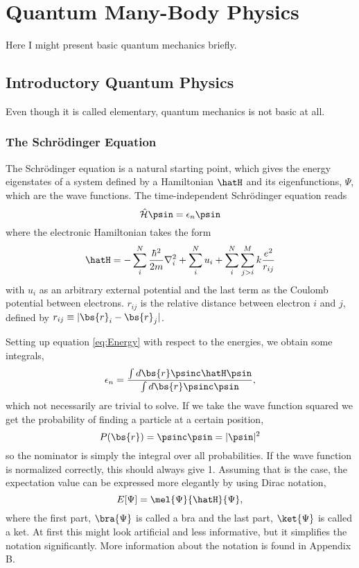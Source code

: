\chapter{Quantum Many-Body Physics} \label{sec:quantum}
Here I might present basic quantum mechanics briefly.

\section{Introductory Quantum Physics} \label{subsec:elementary}
Even though it is called elementary, quantum mechanics is not basic at all. 

\subsection{The Schrödinger Equation} \label{subsubsec:schrodinger}
The Schrödinger equation is a natural starting point, which gives the energy eigenstates of a system defined by a Hamiltonian $\hatH$ and its eigenfunctions, $\Psi$, which are the wave functions. The time-independent Schrödinger equation reads
\begin{equation}
\label{eq:Energy}
 \hat{\mathcal{H}}\psin=\epsilon_n\psin
\end{equation}
where the electronic Hamiltonian takes the form
\begin{equation}
\hatH=-\sum_i^N\frac{\hbar^2}{2m}\nabla_i^2+\sum_i^Nu_i + \sum_i^N\sum_{j>i}^Mk\frac{e^2}{r_{ij}}
\label{eq:ElectronicHamiltonian}
\end{equation}
with $u_i$ as an arbitrary external potential and the last term as the Coulomb potential between electrons. $r_{ij}$ is the relative distance between electron $i$ and $j$, defined by $r_{ij}\equiv|\bs{r}_i-\bs{r}_j|$.

Setting up equation \eqref{eq:Energy} with respect to the energies, we obtain some integrals,
\begin{equation}
\epsilon_n=\frac{\int d\bs{r}\psinc\hatH\psin}{\int d\bs{r}\psinc\psin},
\label{eq:energyintegral}
\end{equation}
which not necessarily are trivial to solve. If we take the wave function squared we get the probability of finding a particle at a certain position,
\begin{equation}
P(\bs{r})=\psinc\psin=|\psin|^2
\end{equation}
so the nominator is simply the integral over all probabilities. If the wave function is normalized correctly, this should always give 1. Assuming that is the case, the expectation value can be expressed more elegantly by using Dirac notation,
\begin{equation}
E[\Psi]=\mel{\Psi}{\hatH}{\Psi},
\end{equation}
where the first part, $\bra{\Psi}$ is called a bra and the last part, $\ket{\Psi}$ is called a ket. At first this might look artificial and less informative, but it simplifies the notation significantly. More information about the notation is found in Appendix B. 

